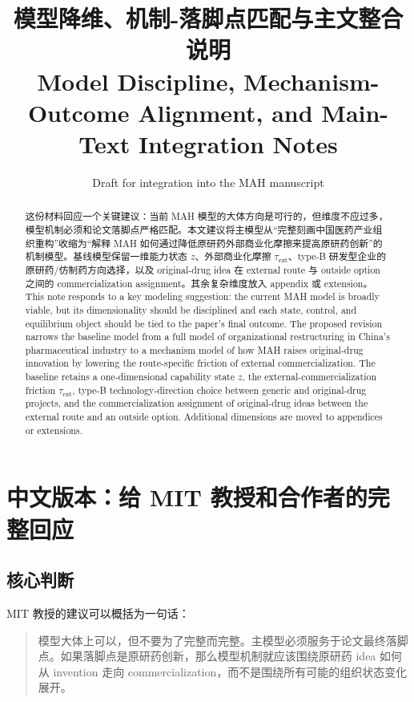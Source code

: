 \documentclass[12pt]{article}
\title{模型降维、机制-落脚点匹配与主文整合说明\\
\large Model Discipline, Mechanism-Outcome Alignment, and Main-Text Integration Notes}
\author{}
\date{Draft for integration into the MAH manuscript}
\newcommand{\tauext}{\tau_{\mathrm{ext}}}
\begin{document}
\maketitle

\begin{abstract}
\noindent
这份材料回应一个关键建议：当前 MAH 模型的大体方向是可行的，但维度不应过多，模型机制必须和论文落脚点严格匹配。本文建议将主模型从“完整刻画中国医药产业组织重构”收缩为“解释 MAH 如何通过降低原研药外部商业化摩擦来提高原研药创新”的机制模型。基线模型保留一维能力状态 $z$、外部商业化摩擦 $\tauext$、type-B 研发型企业的原研药/仿制药方向选择，以及 original-drug idea 在 external route 与 outside option 之间的 commercialization assignment。其余复杂维度放入 appendix 或 extension。\\[0.6em]
\noindent
This note responds to a key modeling suggestion: the current MAH model is broadly viable, but its dimensionality should be disciplined and each state, control, and equilibrium object should be tied to the paper's final outcome. The proposed revision narrows the baseline model from a full model of organizational restructuring in China's pharmaceutical industry to a mechanism model of how MAH raises original-drug innovation by lowering the route-specific friction of external commercialization. The baseline retains a one-dimensional capability state $z$, the external-commercialization friction $\tauext$, type-B technology-direction choice between generic and original-drug projects, and the commercialization assignment of original-drug ideas between the external route and an outside option. Additional dimensions are moved to appendices or extensions.
\end{abstract}

\tableofcontents
\newpage

\section{中文版本：给 MIT 教授和合作者的完整回应}

\subsection{核心判断}

MIT 教授的建议可以概括为一句话：
\begin{quote}
模型大体上可以，但不要为了完整而完整。主模型必须服务于论文最终落脚点。如果落脚点是原研药创新，那么模型机制就应该围绕原研药 idea 如何从 invention 走向 commercialization，而不是围绕所有可能的组织状态变化展开。
\end{quote}
\end{document}
